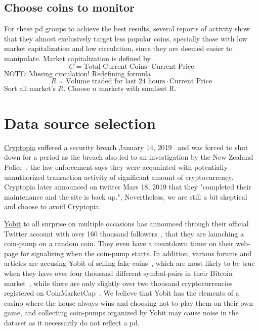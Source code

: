\subsection{Choose coins to monitor}
For these \ac{pd} groups to achieve the best results, several reports of activity show that they almost exclusively target less popular coins, specially those with low market capitalization and low circulation, since they are deemed easier to manipulate\cite{P&D_avoid_getting_duped, P&D_here_is_how, P&D_how_to_spot}. Market capitalization is defined by \cite{cryptocurrency_market_cap}. 
\begin{equation}
    C = \text{Total Current Coins} \cdot \text{Current Price}
\end{equation}
NOTE:
Missing circulation! Redefining formula
\begin{equation}
    R = \text{Volume traded for last 24 hours} \cdot \text{Current Price}
\end{equation}
Sort all market's $R$. Choose $n$ markets with smallest R.


\section{Data source selection}

\href{https://www.cryptopia.co.nz/}{Cryptopia} suffered a security breach January 14, 2019~\cite{cryptopia_breach_2} and was forced to shut down for a period as the breach also led to an investigation by the New Zealand Police~\cite{cryptopia_breach_1}, the law enforcement says they were acquainted with potentially unauthorized transaction activity of significant amount of cryptocurrency. Cryptopia later announced on twitter Mars 18, 2019 that they "completed their maintenance and the site is back up.", Nevertheless, we are still a bit skeptical and choose to avoid Cryptopia.

\href{https://yobit.net/en/}{Yobit} to all surprise on multiple occasions has announced through their official Twitter account with over 160 thousand followers~\cite{yobit_twitter}, that they are launching a coin-pump on a random coin. They even have a countdown timer on their web-page for signalizing when the coin-pump starts. In addition, various forums and articles are accusing Yobit of selling fake coins~\cite{yobit_fake_1, yobit_fake_2, yobit_fake_3}, which are most likely to be true when they have over four thousand different symbol-pairs in their Bitcoin market~\cite{yobit_market}, while there are only slightly over two thousand cryptocurrencies registered on CoinMarketCap~\cite{coinmarketcap}. We believe that Yobit has the elements of a casino where the house always wins and choosing not to play them on their own game, and collecting coin-pumps organized by Yobit may cause noise in the dataset as it necessarily do not reflect a \ac{pd}.

